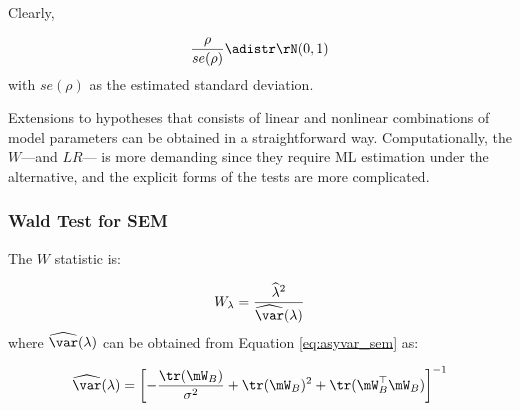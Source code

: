 \documentclass[english,12pt]{book}\usepackage[]{graphicx}\usepackage[]{xcolor}
\begin{document}
Clearly, 

\begin{equation}
 \frac{\rho}{se(\rho)}\adistr \rN(0, 1)
\end{equation}
%
with $se(\rho)$ as the estimated standard deviation. 

Extensions to hypotheses that consists of linear and nonlinear combinations of model parameters can be obtained in a straightforward way. Computationally, the $W$---and $LR$--- is more demanding since they require ML estimation under the alternative, and the explicit forms of the tests are more complicated.

\subsubsection{Wald Test for SEM}

The $W$ statistic is:

\begin{equation}
W_{\lambda} = \frac{\widehat{\lambda}^2}{\widehat{\var}(\lambda)}
\end{equation}
%
where $\widehat{\var}(\lambda)$ can be obtained from Equation \ref{eq:asyvar_sem} as:

\begin{equation}
  \widehat{\var}(\lambda) = \left[ - \frac{\tr(\mW_B)}{\sigma^2} + \tr(\mW_B)^2 + \tr(\mW_B^\top\mW_B)\right]^{-1}
\end{equation}
\end{document}
